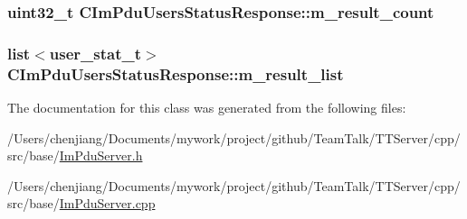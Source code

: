 \subsubsection[{m\+\_\+result\+\_\+count}]{\setlength{\rightskip}{0pt plus 5cm}uint32\+\_\+t C\+Im\+Pdu\+Users\+Status\+Response\+::m\+\_\+result\+\_\+count\hspace{0.3cm}{\ttfamily [private]}}\label{class_c_im_pdu_users_status_response_a1081fe313aacd54677a59fae8173bbfb}
\hypertarget{class_c_im_pdu_users_status_response_a9b552aee5a78c3edd25f35af475a401d}{}
\subsubsection[{m\+\_\+result\+\_\+list}]{\setlength{\rightskip}{0pt plus 5cm}list$<${\bf user\+\_\+stat\+\_\+t}$>$ C\+Im\+Pdu\+Users\+Status\+Response\+::m\+\_\+result\+\_\+list\hspace{0.3cm}{\ttfamily [private]}}\label{class_c_im_pdu_users_status_response_a9b552aee5a78c3edd25f35af475a401d}


The documentation for this class was generated from the following files\+:\begin{DoxyCompactItemize}
\item 
/\+Users/chenjiang/\+Documents/mywork/project/github/\+Team\+Talk/\+T\+T\+Server/cpp/src/base/\hyperlink{_im_pdu_server_8h}{Im\+Pdu\+Server.\+h}\item 
/\+Users/chenjiang/\+Documents/mywork/project/github/\+Team\+Talk/\+T\+T\+Server/cpp/src/base/\hyperlink{_im_pdu_server_8cpp}{Im\+Pdu\+Server.\+cpp}\end{DoxyCompactItemize}
